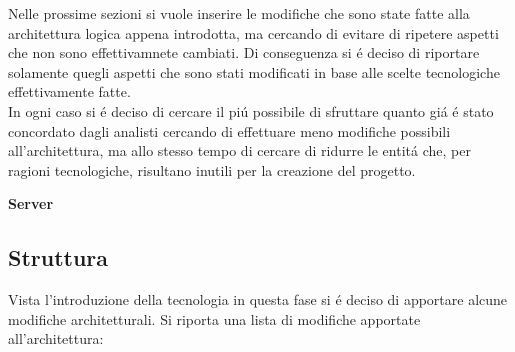 Nelle prossime sezioni si vuole inserire le modifiche che sono state fatte alla architettura logica appena introdotta, ma cercando di evitare di ripetere aspetti che non sono effettivamnete cambiati. Di conseguenza si \'e deciso di riportare solamente quegli aspetti che sono stati modificati in base alle scelte tecnologiche effettivamente fatte.\\
In ogni caso si \'e deciso di cercare il pi\'u possibile di sfruttare quanto gi\'a \'e stato concordato dagli analisti cercando di effettuare meno modifiche possibili all'architettura, ma allo stesso tempo di cercare di ridurre le entit\'a che, per ragioni tecnologiche, risultano inutili per la creazione del progetto.

\begin{center}
  \textbf{Server}
\end{center}

\subsection{Struttura}

Vista l'introduzione della tecnologia in questa fase si \'e deciso di apportare alcune modifiche architetturali. Si riporta una lista di modifiche apportate all'architettura:

